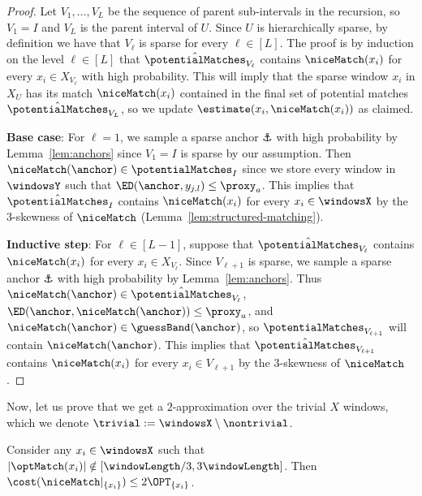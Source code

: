 \begin{proof}
    Let $V_1, \ldots, V_L$ be the sequence of parent sub-intervals in the recursion, so $V_1 = I$ and $V_L$ is the parent interval of $U$. Since $U$ is hierarchically sparse, by definition we have that $V_\ell$ is sparse for every $\ell \in [L]$. 
    The proof is by induction on the level $\ell \in [L]$ that $\hat{\potentialMatches}_{V_\ell}$ contains $\niceMatch(x_i)$ for every $x_i \in X_{V_\ell}$ with high probability. This will imply that the sparse window $x_i$ in $X_U$ has its match $\niceMatch(x_i)$ contained in the final set of potential matches $\hat{\potentialMatches}_{V_L}$, so we update $\estimate(x_i, \niceMatch(x_i))$ as claimed.
    
    \textbf{Base case}: For $\ell = 1$, we sample a sparse anchor $\anchor$ with high probability by Lemma~\ref{lem:anchors} since $V_1 = I$ is sparse by our assumption. Then $\niceMatch(\anchor) \in \potentialMatches_I$ since we store every window in $\windowsY$ such that $\ED(\anchor, y_{j, l}) \leq \proxy_a$. 
    This implies that $\hat{\potentialMatches}_I$ contains $\niceMatch(x_i)$ for every $x_i \in \windowsX$ by the $3$-skewness of $\niceMatch$ (Lemma~\ref{lem:structured-matching}).
    
    \textbf{Inductive step}: For $\ell \in [L-1]$, suppose that $\hat{\potentialMatches}_{V_\ell}$ contains $\niceMatch(x_i)$ for every $x_i \in X_{V_\ell}$. Since $V_{\ell+1}$ is sparse, we sample a sparse anchor $\anchor$ with high probability by Lemma~\ref{lem:anchors}. Thus $\niceMatch(\anchor) \in \hat{\potentialMatches}_{V_\ell}$,  $\ED(\anchor, \niceMatch(\anchor)) \leq \proxy_a$, and $\niceMatch(\anchor) \in \guessBand(\anchor)$, so $\potentialMatches_{V_{\ell+1}}$ will contain $\niceMatch(\anchor)$. This implies that $\hat{\potentialMatches}_{V_{\ell+1}}$ contains $\niceMatch(x_i)$ for every $x_i \in V_{\ell+1}$ by the $3$-skewness of $\niceMatch$.
\end{proof}

Now, let us prove that we get a $2$-approximation over the trivial $X$ windows, which we denote $\trivial := \windowsX \setminus \nontrivial$.

\begin{lemma}
    \label{lem:trivial-match}
    Consider any $x_i \in \windowsX$ such that $|\optMatch(x_i)| \notin [\windowLength/3, 3\windowLength]$. Then $\cost(\niceMatch|_{\{x_i\}}) \leq 2\OPT_{\{x_i\}}$.
\end{lemma}

